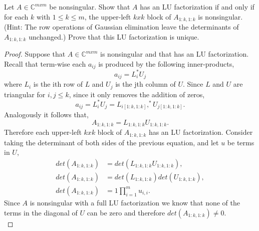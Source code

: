 \documentclass[12pt]{article}
\makeatletter
\theoremstyle{homework}
\newenvironment{exercise}[1]
{\def\@currentlabel{#1}\exercisecore}
{\endexercisecore}
\newcommand{\Cplx}{\ensuremath{\mathbb C}}
\let\CC\Cplx
\makeatother
\begin{document}
\begin{exercise}{20.1} Let $A \in \CC^{mxm}$ be nonsingular. Show that $A$ has an LU factorization if and only if for each $k$ with 
  $1 \leq k \leq m$, the upper-left $kxk$ block of $A_{1:k, 1:k}$ is nonsingular.(Hint: The row operations of Gaussian elimination leave the 
  determinants of $A_{1:k, 1:k}$ unchanged.) Prove that this LU factorization is unique. \\
  \begin{proof} Suppose that $A \in \CC^{mxm}$ is nonsingular and that has an LU factorization. Recall that term-wise each $a_{ij}$ is produced by the 
    following inner-products, 
    \begin{equation*}
      a_{ij} = L_i^*U_j
    \end{equation*}
    where $L_i$ is the ith row of $L$ and $U_j$ is the jth column of $U$. Since $L$ and $U$ are triangular for $i, j \leq k$, since it only removes the addition of zeros,  
    \begin{equation*}
      a_{ij} = L_i^*U_j = L_{i[1:k, 1:k]}, ^*U_{j[1:k, 1:k]}. 
    \end{equation*} 
    Analogously it follows that, 
    \begin{equation*}
      A_{1:k, 1:k} = L_{1:k, 1:k}U_{1:k, 1:k}. 
    \end{equation*}
    Therefore each upper-left $kxk$ block of $A_{1:k, 1:k}$ has an LU factorization. Consider taking the determinant of both sides of the previous equation, and let $u$ be terms in $U$, 
    \begin{align*}
     det(A_{1:k, 1:k}) &= det(L_{1:k, 1:k}U_{1:k, 1:k}),\\
     det(A_{1:k, 1:k}) &= det(L_{1:k, 1:k}) det(U_{1:k, 1:k}),\\
     det(A_{1:k, 1:k}) &= 1 \prod_{i = 1}^m u_{i, i}.
    \end{align*} 
    Since $A$ is nonsingular with a full LU factorization we know that none of the terms in the diagonal of $U$ can be zero and therefore $det(A_{1:k, 1:k}) \neq 0$.\\



\end{proof}
\end{exercise}
\end{document}

